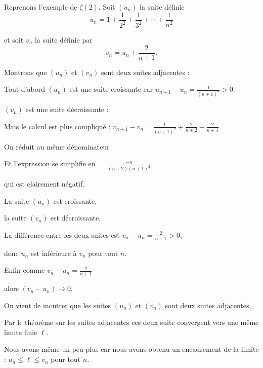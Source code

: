 \diapo

Reprenons l'exemple de $\zeta(2)$. 
Soit $(u_n)$ la suite définie 
$$u_n =  1+\frac{1}{2^2} +\frac{1}{3^2}+\cdots+\frac{1}{n^2}$$

\change

et soit $v_n$ la suite définie par $$ v_n = u_n + \frac2{n+1} .$$

\change

Montrons que $(u_n)$ et $(v_n)$ sont deux suites adjacentes :

\change

Tout d'abord $(u_n)$ est une suite croissante car $u_{n+1}-u_n = \frac{1}{(n+1)^2} > 0$.

\change

$(v_n)$ est une suite décroissante :
    
    
Mais le calcul est plus compliqué :
$v_{n+1}-v_n = \frac{1}{(n+1)^2} + \frac{2}{n+2} - \frac{2}{n+1} $

\change

On réduit au même dénominateur 

\change

Et l'expression se simplifie en 
$= \frac{-n}{(n+2)(n+1)^2}$

qui est clairement négatif.


La suite $(u_n)$ est croissante, 

la suite $(v_n)$ est décroissante.


\change


La différence entre les deux suites est
$v_n-u_n = \frac{2}{n+1} >0$, 

\change

donc $u_n$ est inférieure à $v_n$ pour tout $n$.

\change

 Enfin comme $v_n-u_n = \frac{2}{n+1}$ 
 
\change

 alors $ (v_n-u_n) \to 0$.

 
 \change
 
 On vient de montrer que les suites $(u_n)$ et $(v_n)$ sont deux suites adjacentes, 
 
 \change
 
 Par le théorème sur les suites adjacentes ces deux suite
 convergent vers une même limite finie $\ell$. 

\change

Nous avons même un peu plus car nous avons obtenu un 
encadrement de la limite : $u_n \le \ell \le v_n$ pour tout $n$.

